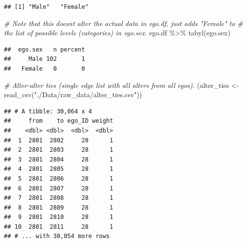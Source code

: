 \documentclass[
]{book}
\newenvironment{Shaded}{\begin{snugshade}}{\end{snugshade}}
\newcommand{\CommentTok}[1]{\textcolor[rgb]{0.56,0.35,0.01}{\textit{#1}}}
\newcommand{\FunctionTok}[1]{\textcolor[rgb]{0.00,0.00,0.00}{#1}}
\newcommand{\NormalTok}[1]{#1}
\newcommand{\OtherTok}[1]{\textcolor[rgb]{0.56,0.35,0.01}{#1}}
\newcommand{\SpecialCharTok}[1]{\textcolor[rgb]{0.00,0.00,0.00}{#1}}
\newcommand{\StringTok}[1]{\textcolor[rgb]{0.31,0.60,0.02}{#1}}
\begin{document}
\begin{verbatim}
## [1] "Male"   "Female"
\end{verbatim}

\begin{Shaded}
\begin{Highlighting}[]
\CommentTok{\# Note that this doesn\textquotesingle{}t alter the actual data in ego.df, just adds "Female" to }
\CommentTok{\# the list of possible levels (categories) in ego.sex.}
\NormalTok{ego.df }\SpecialCharTok{\%\textgreater{}\%}
  \FunctionTok{tabyl}\NormalTok{(ego.sex)}
\end{Highlighting}
\end{Shaded}

\begin{verbatim}
##  ego.sex   n percent
##     Male 102       1
##   Female   0       0
\end{verbatim}

\begin{Shaded}
\begin{Highlighting}[]
\CommentTok{\# Alter{-}alter ties (single edge list with all alters from all egos).}
\NormalTok{(alter\_ties }\OtherTok{\textless{}{-}} \FunctionTok{read\_csv}\NormalTok{(}\StringTok{"./Data/raw\_data/alter\_ties.csv"}\NormalTok{))}
\end{Highlighting}
\end{Shaded}

\begin{verbatim}
## # A tibble: 30,064 x 4
##     from    to ego_ID weight
##    <dbl> <dbl>  <dbl>  <dbl>
##  1  2801  2802     28      1
##  2  2801  2803     28      1
##  3  2801  2804     28      1
##  4  2801  2805     28      1
##  5  2801  2806     28      1
##  6  2801  2807     28      1
##  7  2801  2808     28      1
##  8  2801  2809     28      1
##  9  2801  2810     28      1
## 10  2801  2811     28      1
## # ... with 30,054 more rows
\end{verbatim}
\end{document}
